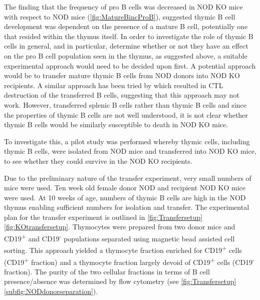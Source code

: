 The finding that the frequency of pro B cells was decreased in NOD KO mice with respect to NOD mice (\cref{fig:MatureBincProB}), suggested thymic B cell development was dependent on the presence of a mature B cell, potentially one that resided within the thymus itself.
In order to investigate the role of thymic B cells in general, and in particular, determine whether or not they have an effect on the pro B cell population seen in the thymus, as suggested above, a suitable experimental approach would need to be decided upon first.
A potential approach would be to transfer mature thymic B cells from NOD donors into NOD KO recipients.
A similar approach has been tried by \citet{Serreze1998} which resulted in CTL destruction of the transferred B cells, suggesting that this approach may not work.
However, \citet{Serreze1998} transferred splenic B cells rather than thymic B cells and since the properties of thymic B cells are not well understood, it is not clear whether thymic B cells would be similarly susceptible to death in NOD KO mice.

To investigate this, a pilot study was performed whereby thymic cells, including thymic B cells, were isolated from NOD mice and transferred into NOD KO mice, to see whether they could survive in the NOD KO recipients.

Due to the preliminary nature of the transfer experiment, very small numbers of mice were used.
Ten week old female donor NOD and recipient NOD KO mice were used.
At 10 weeks of age, numbers of thymic B cells are high in the NOD thymus enabling sufficient numbers for isolation and transfer.
The experimental plan for the transfer experiment is outlined in \cref{fig:Transfersetup}\ref{fig:KOtransfersetup}.
Thymocytes were prepared from two donor mice and CD19\textsuperscript{+} and CD19\textsuperscript{-} populations separated using magnetic bead assisted cell sorting.
This approach yielded a thymocyte fraction enriched for CD19\textsuperscript{+} cells (CD19\textsuperscript{+} fraction) and a thymocyte fraction largely devoid of CD19\textsuperscript{+} cells (CD19\textsuperscript{-} fraction).
The purity of the two cellular fractions in terms of B cell presence/absence was determined by flow cytometry (see \cref{fig:Transfersetup}\ref{subfig:NODdonorseparation}).


